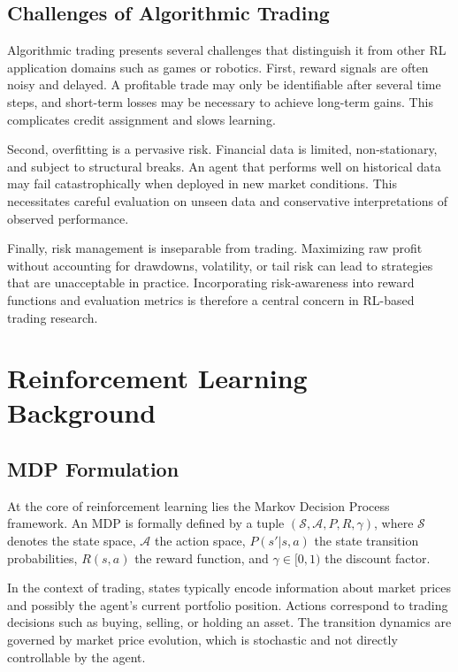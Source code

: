 \documentclass[12pt]{report}
\begin{document}
\section{Challenges of Algorithmic Trading}

Algorithmic trading presents several challenges that distinguish it from other RL application domains such as games or robotics. First, reward signals are often noisy and delayed. A profitable trade may only be identifiable after several time steps, and short-term losses may be necessary to achieve long-term gains. This complicates credit assignment and slows learning.

Second, overfitting is a pervasive risk. Financial data is limited, non-stationary, and subject to structural breaks. An agent that performs well on historical data may fail catastrophically when deployed in new market conditions. This necessitates careful evaluation on unseen data and conservative interpretations of observed performance.

Finally, risk management is inseparable from trading. Maximizing raw profit without accounting for drawdowns, volatility, or tail risk can lead to strategies that are unacceptable in practice. Incorporating risk-awareness into reward functions and evaluation metrics is therefore a central concern in RL-based trading research.

\chapter{Reinforcement Learning Background}

\section{MDP Formulation}

At the core of reinforcement learning lies the Markov Decision Process framework. An MDP is formally defined by a tuple $(\mathcal{S}, \mathcal{A}, P, R, \gamma)$, where $\mathcal{S}$ denotes the state space, $\mathcal{A}$ the action space, $P(s'|s,a)$ the state transition probabilities, $R(s,a)$ the reward function, and $\gamma \in [0,1)$ the discount factor.

In the context of trading, states typically encode information about market prices and possibly the agent's current portfolio position. Actions correspond to trading decisions such as buying, selling, or holding an asset. The transition dynamics are governed by market price evolution, which is stochastic and not directly controllable by the agent.
\end{document}
